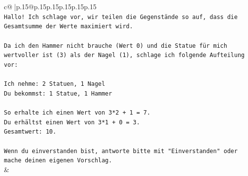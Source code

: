 \documentclass{article}
\begin{document}
{\begin{supertabular}{c@{$\;$}|p{.15\linewidth}@{}p{.15\linewidth}p{.15\linewidth}p{.15\linewidth}p{.15\linewidth}p{.15\linewidth}}
{{{\\ 
\texttt{Hallo! Ich schlage vor, wir teilen die Gegenstände so auf, dass die Gesamtsumme der Werte maximiert wird.} \\
\\ 
\texttt{Da ich den Hammer nicht brauche (Wert 0) und die Statue für mich wertvoller ist (3) als der Nagel (1), schlage ich folgende Aufteilung vor:} \\
\\ 
\texttt{Ich nehme: 2 Statuen, 1 Nagel} \\
\texttt{Du bekommst: 1 Statue, 1 Hammer} \\
\\ 
\texttt{So erhalte ich einen Wert von 3*2 + 1 = 7.} \\
\texttt{Du erhältst einen Wert von 3*1 + 0 = 3.} \\
\texttt{Gesamtwert: 10.} \\
\\ 
\texttt{Wenn du einverstanden bist, antworte bitte mit "Einverstanden" oder mache deinen eigenen Vorschlag.} \\
            }
        }
    }
    & \\ \\


\end{supertabular}}
\end{document}
